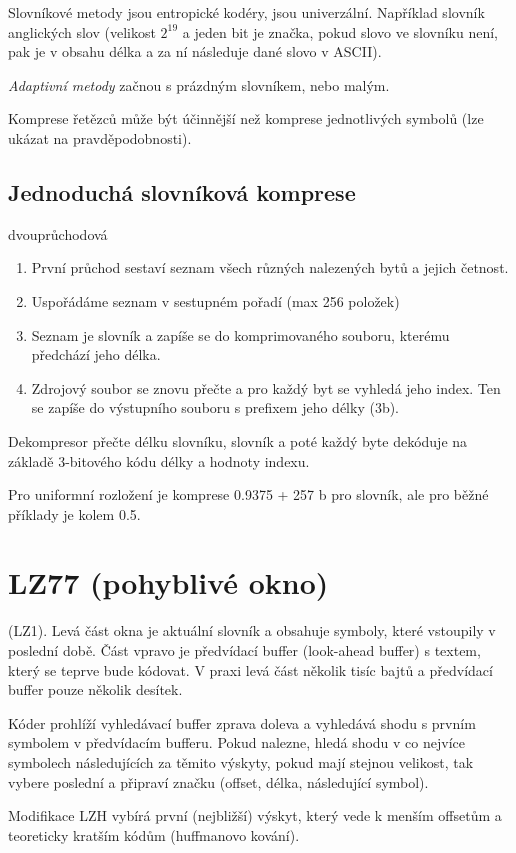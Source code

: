 \documentclass[a4paper, 11pt]{report}
\begin{document}
Slovníkové metody jsou entropické kodéry, jsou univerzální. Například slovník anglických slov (velikost $2^19$ a jeden bit je značka, pokud slovo ve slovníku není, pak je v obsahu délka a za ní následuje dané slovo v ASCII).

\emph{Adaptivní metody} začnou s prázdným slovníkem, nebo malým.

Komprese řetězců  může být účinnější než komprese jednotlivých symbolů (lze ukázat na pravděpodobnosti).

\subsection{Jednoduchá slovníková komprese}
dvouprůchodová
\begin{enumerate}
	\item První průchod sestaví seznam všech různých nalezených bytů a jejich četnost.
	\item Uspořádáme seznam v sestupném pořadí (max 256 položek)
	\item Seznam je slovník a zapíše se do komprimovaného souboru, kterému předchází jeho délka.
	\item Zdrojový soubor se znovu přečte a pro každý byt se vyhledá jeho index. Ten se zapíše do výstupního souboru s prefixem jeho délky (3b).
\end{enumerate}
Dekompresor přečte délku slovníku, slovník a poté každý byte dekóduje na základě 3-bitového kódu délky a hodnoty indexu.

Pro uniformní rozložení je komprese 0.9375 + 257 b pro slovník, ale pro běžné příklady je kolem 0.5.

\section{LZ77 (pohyblivé okno)}
(LZ1). Levá část okna je aktuální slovník a obsahuje symboly, které vstoupily v poslední době. Část vpravo je předvídací buffer (look-ahead buffer) s textem, který se teprve bude kódovat. V praxi levá část několik tisíc bajtů a předvídací buffer pouze několik desítek.

Kóder prohlíží vyhledávací buffer zprava doleva a vyhledává shodu s prvním symbolem v předvídacím bufferu. Pokud nalezne, hledá shodu v co nejvíce symbolech následujících za těmito výskyty, pokud mají stejnou velikost, tak vybere poslední a připraví značku (offset, délka, následující symbol).

Modifikace LZH vybírá první (nejbližší) výskyt, který vede k menším offsetům a teoreticky kratším kódům (huffmanovo kování).
\end{document}
